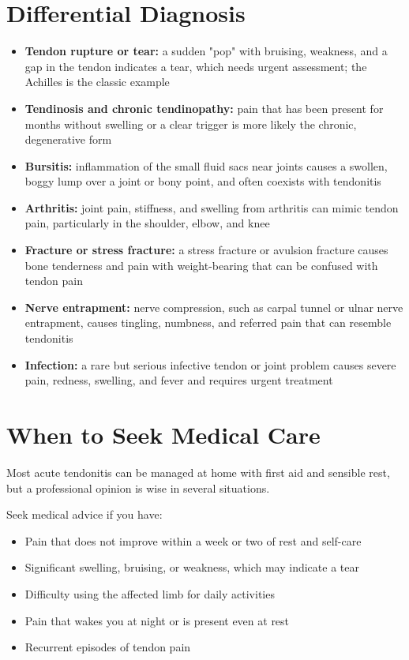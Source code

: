 \section*{Differential Diagnosis}
\begin{itemize}
    \item \textbf{Tendon rupture or tear:} a sudden "pop" with bruising, weakness, and a gap in the tendon indicates a tear, which needs urgent assessment; the Achilles is the classic example
    \item \textbf{Tendinosis and chronic tendinopathy:} pain that has been present for months without swelling or a clear trigger is more likely the chronic, degenerative form
    \item \textbf{Bursitis:} inflammation of the small fluid sacs near joints causes a swollen, boggy lump over a joint or bony point, and often coexists with tendonitis
    \item \textbf{Arthritis:} joint pain, stiffness, and swelling from arthritis can mimic tendon pain, particularly in the shoulder, elbow, and knee
    \item \textbf{Fracture or stress fracture:} a stress fracture or avulsion fracture causes bone tenderness and pain with weight-bearing that can be confused with tendon pain
    \item \textbf{Nerve entrapment:} nerve compression, such as carpal tunnel or ulnar nerve entrapment, causes tingling, numbness, and referred pain that can resemble tendonitis
    \item \textbf{Infection:} a rare but serious infective tendon or joint problem causes severe pain, redness, swelling, and fever and requires urgent treatment
\end{itemize}

\section*{When to Seek Medical Care}
Most acute tendonitis can be managed at home with first aid and sensible rest, but a professional opinion is wise in several situations.

Seek medical advice if you have:
\begin{itemize}
    \item Pain that does not improve within a week or two of rest and self-care
    \item Significant swelling, bruising, or weakness, which may indicate a tear
    \item Difficulty using the affected limb for daily activities
    \item Pain that wakes you at night or is present even at rest
    \item Recurrent episodes of tendon pain
\end{itemize}

